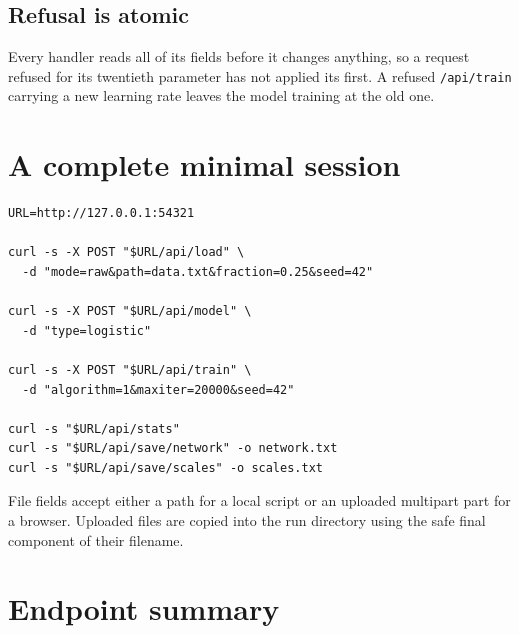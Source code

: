 \subsection*{Refusal is atomic}
Every handler reads all of its fields before it changes anything, so a
request refused for its twentieth parameter has not applied its first.
A refused \texttt{/api/train} carrying a new learning rate leaves the
model training at the old one.

\section{A complete minimal session}

\begin{verbatim}
URL=http://127.0.0.1:54321

curl -s -X POST "$URL/api/load" \
  -d "mode=raw&path=data.txt&fraction=0.25&seed=42"

curl -s -X POST "$URL/api/model" \
  -d "type=logistic"

curl -s -X POST "$URL/api/train" \
  -d "algorithm=1&maxiter=20000&seed=42"

curl -s "$URL/api/stats"
curl -s "$URL/api/save/network" -o network.txt
curl -s "$URL/api/save/scales" -o scales.txt
\end{verbatim}

File fields accept either a path for a local script or an uploaded
multipart part for a browser.  Uploaded files are copied into the run
directory using the safe final component of their filename.

\section{Endpoint summary}

